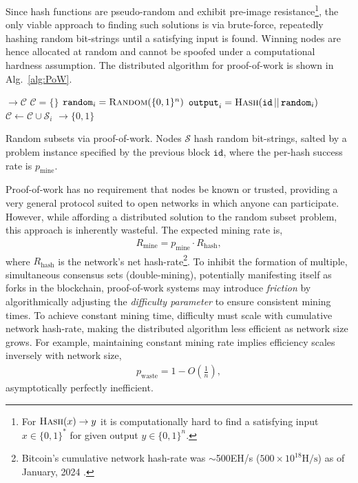 Since hash functions are pseudo-random and exhibit pre-image resistance\footnote{For $\textsc{Hash}(x)\to y$ it is computationally hard to find a satisfying input $x\in\{0,1\}^*$ for given output $y\in\{0,1\}^n$.}, the only viable approach to finding such solutions is via brute-force, repeatedly hashing random bit-strings until a satisfying input is found. Winning nodes are hence allocated at random and cannot be spoofed under a computational hardness assumption. The distributed algorithm for proof-of-work is shown in Alg.~\ref{alg:PoW}.

\begin{algorithm}[H]
	\begin{algorithmic}
		 $\to \mathcal{C}$
		\State $\mathcal{C} = \{\}$ 
		 
		\State $\mathtt{random}_i = \textsc{Random}(\{0,1\}^n)$
		\State $\mathtt{output}_i = \textsc{Hash}(\mathtt{id}\,||\,\mathtt{random}_i)$
		\State $\mathcal{C} \gets \mathcal{C} \cup \mathcal{S}_i$
		\EndIf
		\EndFor
		\EndWhile
		\State {}
		\EndFunction
		\State
		 $\to \{0,1\}$
		\State {}
		\Else
		\State {}
		\EndIf
		\EndFunction
	\end{algorithmic}
	\caption{Random subsets via proof-of-work. Nodes $\mathcal{S}$ hash random bit-strings, salted by a problem instance specified by the previous block $\mathtt{id}$, where the per-hash success rate is $p_\mathrm{mine}$.} \label{alg:PoW}
\end{algorithm}

Proof-of-work has no requirement that nodes be known or trusted, providing a very general protocol suited to open networks in which anyone can participate. However, while affording a distributed solution to the random subset problem, this approach is inherently wasteful. The expected mining rate is,
\begin{align}
	R_\mathrm{mine} = p_\mathrm{mine}\cdot R_\mathrm{hash},
\end{align}
where $R_\mathrm{hash}$ is the network's net hash-rate\footnote{Bitcoin's cumulative network hash-rate was $\sim$500EH/s \mbox{($500\times 10^{18}\mathrm{H/s}$)} as of January, 2024 \cite{hashrate}.}. To inhibit the formation of multiple, simultaneous consensus sets (double-mining), potentially manifesting itself as forks in the blockchain, proof-of-work systems may introduce \emph{friction} by algorithmically adjusting the \emph{difficulty parameter} to ensure consistent mining times. To achieve constant mining time, difficulty must scale with cumulative network hash-rate, making the distributed algorithm less efficient as network size grows. For example, maintaining constant mining rate implies efficiency scales inversely with network size,
\begin{align}
	p_\mathrm{waste}=1-O\left(\frac{1}{n}\right),
\end{align}
asymptotically perfectly inefficient.

